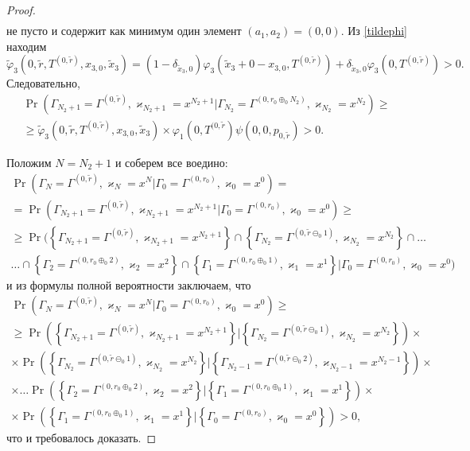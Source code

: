 \documentclass[a4paper,12pt,russian]{extarticle}
\begin{document}
\begin{proof}
\begin{align*}
\end{align*}
не пусто и содержит как минимум один элемент $(a_1,a_2)=(0,0)$. Из \eqref{tildephi} находим
\begin{equation*}
\widetilde{\varphi}_3(0,\tilde{r},T^{(0,\tilde{r})},x_{3,0},\tilde{x}_3)= (1-\delta_{\tilde{x}_3,0}) \varphi_3(\tilde{x}_3 + 0 - x_{3,0},T^{(0,\tilde{r})} ) + \delta_{\tilde{x}_3,0} \varphi_3(0,T^{(0,\tilde{r})}) > 0.
\end{equation*}
Следовательно, 
\begin{multline*}
\Pr (\Gamma_{N_2+1}=\Gamma^{(0,\tilde{r})},\varkappa_{N_2+1}=x^{N_2+1} | \Gamma_{N_2}=\Gamma^{(0,r_0\oplus_{0}N_2)},\varkappa_{N_2}=x^{N_2})\geqslant\\
\geqslant \widetilde{\varphi}_3(0,\tilde{r},T^{(0,\tilde{r})},x_{3,0},\tilde{x}_3)
\times
\varphi_1(0,T^{(0,\tilde{r}}) \psi(0,0, p_{0,\tilde{r}}) > 0.
\end{multline*}

Положим $N = N_2+1$ и соберем все воедино:
\begin{multline*}
\Pr(\Gamma_{N}=\Gamma^{(0,\tilde{r} )}, \varkappa_{N}=x^N|
\Gamma_{0}=\Gamma^{(0,r_0)}, \varkappa_{0}=x^0) = \\ =
\Pr(\Gamma_{ N_2+1}=\Gamma^{(0,\tilde{r} )}, \varkappa_{ N_2+1}=x^{N_2+1}|
\Gamma_{0}=\Gamma^{(0,r_0)}, \varkappa_{0}=x^0) \geqslant \\ 
\geqslant
\Pr(\left\{\Gamma_{ N_2+1}=\Gamma^{(0,\tilde{r} )}, \varkappa_{ N_2+1}=x^{N_2+1}\right\} \cap \left\{ \Gamma_{ N_2}=\Gamma^{(0,\tilde{r} \ominus_0 1 )}, \varkappa_{N_2}=x^{N_2}\right\} \cap\ldots \\
\ldots \cap \left\{\Gamma_{2}=\Gamma^{(0,r_0\oplus_{0}2)},\varkappa_{2}=x^2\right\} \cap \left\{ \Gamma_{1}=\Gamma^{(0,r_0\oplus_{0}1)},\varkappa_{1}=x^1\right\} |
\Gamma_{0}=\Gamma^{(0,r_0)}, \varkappa_{0}=x^0)
\end{multline*}
и из формулы полной вероятности заключаем, что 
\begin{multline*}
\Pr(\Gamma_{N}=\Gamma^{(0,\tilde{r} )}, \varkappa_{N}=x^N |
\Gamma_{0}=\Gamma^{(0,r_0)}, \varkappa_{0}=x^0) \geqslant \\ 
\geqslant
\Pr(\left\{\Gamma_{ N_2+1}=\Gamma^{(0,\tilde{r} )}, \varkappa_{ N_2+1}=x^{N_2+1}\right\} | \left\{ \Gamma_{ N_2}=\Gamma^{(0,\tilde{r} \ominus_0 1 )}, \varkappa_{N_2}=x^{N_2}\right\}) \times 
\\ \times
\Pr(\left\{\Gamma_{ N_2}=\Gamma^{(0,\tilde{r} \ominus_0 1 )}, \varkappa_{ N_2}=x^{N_2}\right\} | \left\{ \Gamma_{ N_2-1}=\Gamma^{(0,\tilde{r} \ominus_0 2 )}, \varkappa_{N_2-1}=x^{N_2-1}\right\}) \times \\
\times \ldots 
\Pr(\left\{\Gamma_{2}=\Gamma^{(0,r_0\oplus_{0}2)},\varkappa_{2}=x^2\right\} | \left\{ \Gamma_{1}=\Gamma^{(0,r_0\oplus_{0}1)},\varkappa_{1}=x^1\right\}) \times \\
\times
\Pr(\left\{\Gamma_{1}=\Gamma^{(0,r_0\oplus_{0}1)},\varkappa_{1}=x^1\right\} | \left\{ \Gamma_{0}=\Gamma^{(0,r_0)},\varkappa_{0}=x^0\right\})>0,
\end{multline*}
что и требовалось доказать.
\end{proof}
\end{document}
